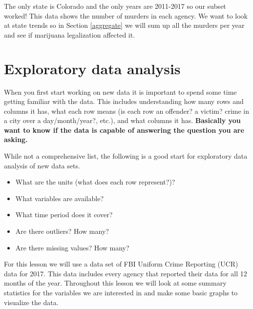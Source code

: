 \documentclass[
  12pt,
  openany]{book}
\newenvironment{Shaded}{\begin{snugshade}}{\end{snugshade}}
\newcommand{\CommentTok}[1]{\textcolor[rgb]{0.37,0.37,0.37}{\textit{#1}}}
\newcommand{\FunctionTok}[1]{\textcolor[rgb]{0,0,0}{#1}}
\newcommand{\NormalTok}[1]{#1}
\newcommand{\SpecialCharTok}[1]{\textcolor[rgb]{0,0,0}{#1}}
\providecommand{\tightlist}{%
  \setlength{\itemsep}{0pt}\setlength{\parskip}{0pt}}
\begin{document}
\begin{Shaded}
\end{Shaded}

\begin{Shaded}
\end{Shaded}

The only state is Colorado and the only years are 2011-2017 so our subset worked! This data shows the number of murders in each agency. We want to look at state trends so in Section \ref{aggregate} we will sum up all the murders per year and see if marijuana legalization affected it.

\hypertarget{explore}{%
\chapter{Exploratory data analysis}\label{explore}}

When you first start working on new data it is important to spend some time getting familiar with the data. This includes understanding how many rows and columns it has, what each row means (is each row an offender? a victim? crime in a city over a day/month/year?, etc.), and what columns it has. \textbf{Basically you want to know if the data is capable of answering the question you are asking.}

While not a comprehensive list, the following is a good start for exploratory data analysis of new data sets.

\begin{itemize}
\tightlist
\item
  What are the units (what does each row represent?)?
\item
  What variables are available?
\item
  What time period does it cover?
\item
  Are there outliers? How many?
\item
  Are there missing values? How many?
\end{itemize}

For this lesson we will use a data set of FBI Uniform Crime Reporting (UCR) data for 2017. This data includes every agency that reported their data for all 12 months of the year. Throughout this lesson we will look at some summary statistics for the variables we are interested in and make some basic graphs to visualize the data.
\end{document}
